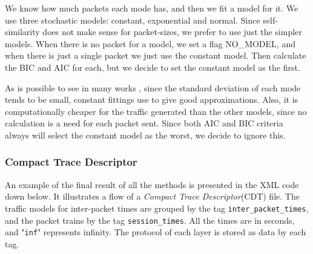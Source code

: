 We know how much packets each mode has, and then we fit a model for it. We use three stochastic models: constant, exponential and normal. Since self-similarity does not make sense for packet-sizes, we prefer to use just the simpler models. When there is no packet for a model, we set a flag NO\_MODEL, and when there is just a single packet we just use the constant model. Then calculate the BIC and AIC for each, but we decide to set the constant model as the first.

As is possible to see in many works \cite{packet-distribution-model} \cite{udp-flows-model}, since the standard deviation of each mode tends to be small, constant fittings use to give good approximations. Also, it is computationally cheaper for the traffic generated than the other models, since no calculation is a need for each packet sent. Since both AIC and BIC criteria always will select the constant model as the worst, we decide to ignore this.


\subsubsection{Compact Trace Descriptor}


An example of the final result of all the methods is presented in the XML code down below. It illustrates a flow of a \textit{Compact Trace Descriptor}(CDT) file. The traffic models for inter-packet times are grouped by the tag \texttt{inter\_packet\_times}, and the packet trains by the tag \texttt{session\_times}. All the times are in seconds, and "\texttt{inf}" represents infinity. The protocol of each layer is stored as data by each tag.

